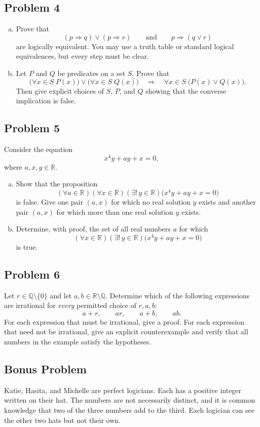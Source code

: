 \documentclass[11pt]{article}
\newcommand{\Q}{\mathbb{Q}}
\newcommand{\R}{\mathbb{R}}
\newcommand{\problem}[2]{\subsection*{Problem #1 \hfill \normalfont[#2 points]}}
\begin{document}
\problem{4}{5}
\begin{enumerate}[(a)]
    \item Prove that
    \[
        (p\Rightarrow q)\vee(p\Rightarrow r)
        \qquad\text{and}\qquad
        p\Rightarrow(q\vee r)
    \]
    are logically equivalent. You may use a truth table or standard logical equivalences, but every step must be clear.

    \item Let $P$ and $Q$ be predicates on a set $S$. Prove that
    \[
        \bigl(\forall x\in S\;P(x)\bigr)
        \vee
        \bigl(\forall x\in S\;Q(x)\bigr)
        \quad\Longrightarrow\quad
        \forall x\in S\;\bigl(P(x)\vee Q(x)\bigr).
    \]
    Then give explicit choices of $S$, $P$, and $Q$ showing that the converse implication is false.
\end{enumerate}


\problem{5}{7}
Consider the equation
\[
    x^4y+ay+x=0,
\]
where $a,x,y\in\R$.
\begin{enumerate}[(a)]
    \item Show that the proposition
    \[
        (\forall a\in\R)(\forall x\in\R)(\exists!\,y\in\R)
        \bigl(x^4y+ay+x=0\bigr)
    \]
    is false. Give one pair $(a,x)$ for which no real solution $y$ exists and another pair $(a,x)$ for which more than one real solution $y$ exists.

    \item Determine, with proof, the set of all real numbers $a$ for which
    \[
        (\forall x\in\R)(\exists!\,y\in\R)
        \bigl(x^4y+ay+x=0\bigr)
    \]
    is true.
\end{enumerate}


\problem{6}{5}
Let $r\in\Q\setminus\{0\}$ and let $a,b\in\R\setminus\Q$.
Determine which of the following expressions are irrational for \emph{every} permitted choice of $r,a,b$:
\[
    a+r,
    \qquad
    ar,
    \qquad
    a+b,
    \qquad
    ab.
\]
For each expression that must be irrational, give a proof.
For each expression that need not be irrational, give an explicit counterexample and verify that all numbers in the example satisfy the hypotheses.


\newpage
\subsection*{Bonus Problem \hfill {}}
Katie, Hasita, and Michelle are perfect logicians. Each has a positive integer written on their hat. 
The numbers are not necessarily distinct, and it is common knowledge that two of the three numbers 
add to the third. Each logician can see the other two hats but not their own.
\end{document}
